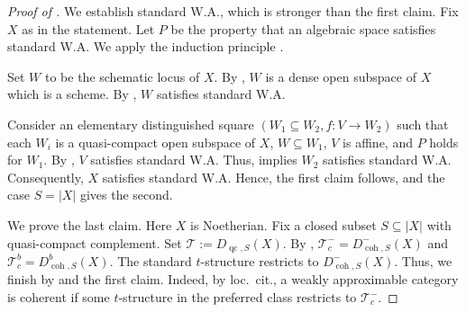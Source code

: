 \documentclass[11pt]{amsart}
\theoremstyle{plain}
\theoremstyle{definition}
\numberwithin{equation}{section}
\numberwithin{theorem}{section}
\begin{document}
\begin{proof}
    [Proof of ]
    We establish standard W.A., which is stronger than the first claim.
    Fix $X$ as in the statement.
    Let $P$ be the property that an algebraic space satisfies standard W.A.
    We apply the induction principle \cite[\href{https://stacks.math.columbia.edu/tag/09IT}{Tag 09IT}]{StacksProject}.

    Set $W$ to be the schematic locus of $X$.
    By \cite[\href{https://stacks.math.columbia.edu/tag/06NH}{Tag 06N}]{StacksProject}, $W$ is a dense open subspace of $X$ which is a scheme.
    By \cite[Theorem 3.2(iii,iv)]{Neeman:2024}, $W$ satisfies standard W.A.

    Consider an elementary distinguished square $(W_1 \subseteq W_2,f\colon V \to W_2)$ such that each $W_i$ is a quasi-compact open subspace of $X$, $W\subseteq W_1$, $V$ is affine, and $P$ holds for $W_1$. 
    By \cite[Theorem 3.2(iii,iv)]{Neeman:2024}, $V$ satisfies standard W.A.
    Thus,  implies $W_2$ satisfies standard W.A.
    Consequently, $X$ satisfies standard W.A.
    Hence, the first claim follows, and the case $S=|X|$ gives the second.

    We prove the last claim.
    Here $X$ is Noetherian. 
    Fix a closed subset $S\subseteq|X|$ with quasi-compact complement.
    Set $\mathcal{T}:=D_{\operatorname{qc},S}(X)$.
    By , $\mathcal{T}^-_c = D^-_{\operatorname{coh},S}(X)$ and $\mathcal{T}^b_c = D^b_{\operatorname{coh},S}(X)$. 
    The standard $t$-structure restricts to $D^-_{\operatorname{coh},S}(X)$. 
    Thus, we finish by \cite[Example 10.1.2]{Canonaco/Haesemeyer/Neeman/Stellari:2024} and the first claim.
    Indeed, by loc.\ cit., a weakly approximable category is coherent if some $t$-structure in the preferred class restricts to $\mathcal{T}^-_c$.
\end{proof}



\end{document}
